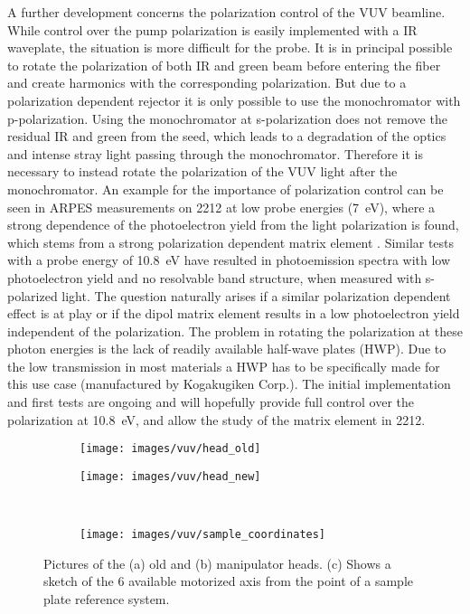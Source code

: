 A further development concerns the polarization control of the VUV beamline.
While control over the pump polarization is easily implemented with a IR waveplate, the situation is more difficult for the probe.
It is in principal possible to rotate the polarization of both IR and green beam before entering the fiber and create harmonics with the corresponding polarization.
But due to a polarization dependent rejector it is only possible to use the monochromator with p-polarization.
Using the monochromator at s-polarization does not remove the residual IR and green from the seed, which leads to a degradation of the optics and intense stray light passing through the monochromator.
Therefore it is necessary to instead rotate the polarization of the VUV light after the monochromator.
An example for the importance of polarization control can be seen in ARPES measurements on 2212 at low probe energies (\qty{7}{\electronvolt}), where a strong dependence of the photoelectron yield from the light polarization is found, which stems from a strong polarization dependent matrix element \cite{fanciulli_spin_2018}.
Similar tests with a probe energy of \qty{10.8}{\electronvolt} have resulted in photoemission spectra with low photoelectron yield and no resolvable band structure, when measured with s-polarized light.
The question naturally arises if a similar polarization dependent effect is at play or if the dipol matrix element results in a low photoelectron yield independent of the polarization.
The problem in rotating the polarization at these photon energies is the lack of readily available half-wave plates (HWP).
Due to the low transmission in most materials a HWP has to be specifically made for this use case (manufactured by Kogakugiken Corp.).
The initial implementation and first tests are ongoing and will hopefully provide full control over the polarization at \qty{10.8}{\electronvolt}, and allow the study of the matrix element in 2212.

\begin{figure}[t]
	\centering
	\begin{subfigure}[b]{0.45\textwidth}
		\texttt{[image: images/vuv/head\_old]}
		\caption{}
	\end{subfigure}
	\begin{subfigure}[b]{0.45\textwidth}
		\texttt{[image: images/vuv/head\_new]}
		\caption{}
	\end{subfigure}
	\\
	\begin{subfigure}[b]{0.45\textwidth}
		\texttt{[image: images/vuv/sample\_coordinates]}
		\caption{}
	\end{subfigure}
	\caption{Pictures of the (a) old and (b) manipulator heads. (c) Shows a sketch of the 6 available motorized axis from the point of a sample plate reference system.}
	\label{fig:manip_head}
\end{figure}

